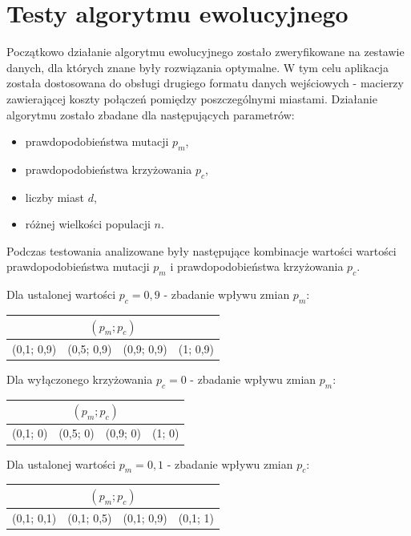 \documentclass[12pt, a4paper]{article}
\begin{document}
\section{Testy algorytmu ewolucyjnego}
Początkowo działanie algorytmu ewolucyjnego zostało zweryfikowane na zestawie danych, dla których znane były rozwiązania optymalne. W tym celu aplikacja została dostosowana do obsługi drugiego formatu danych wejściowych - macierzy zawierającej koszty połączeń pomiędzy poszczególnymi miastami.
Działanie algorytmu zostało zbadane dla następujących parametrów:
\begin{itemize}
	\item prawdopodobieństwa mutacji $p_m$,
	\item prawdopodobieństwa krzyżowania $p_c$,
	\item liczby miast $d$,
	\item różnej wielkości populacji $n$.
\end{itemize}

Podczas testowania analizowane były następujące kombinacje wartości wartości prawdopodobieństwa mutacji $p_m$ i prawdopodobieństwa krzyżowania $p_c$.

\bigskip

Dla ustalonej wartości $p_c = 0,9$ - zbadanie wpływu zmian $p_m$:
\begin{center}
\begin{tabular}{|l|l|l|l|}
\hline
\multicolumn{4}{|c|}{$(p_m; p_c)$} \\
\hline
(0,1; 0,9) & (0,5; 0,9) & (0,9; 0,9) & (1; 0,9)\\
\hline
\end{tabular}
\end{center}

\bigskip

Dla wyłączonego krzyżowania $p_c = 0$ - zbadanie wpływu zmian $p_m$:
\begin{center}
\begin{tabular}{|l|l|l|l|}
\hline
\multicolumn{4}{|c|}{$(p_m; p_c)$} \\
\hline
(0,1; 0) & (0,5; 0) & (0,9; 0) & (1; 0)\\
\hline
\end{tabular}
\end{center}

\bigskip

Dla ustalonej wartości $p_m = 0,1$ - zbadanie wpływu zmian $p_c$:
\begin{center}
\begin{tabular}{|l|l|l|l|}
\hline
\multicolumn{4}{|c|}{$(p_m; p_c)$} \\
\hline
(0,1; 0,1) & (0,1; 0,5) & (0,1; 0,9) & (0,1; 1)\\
\hline
\end{tabular}
\end{center}
\end{document}
